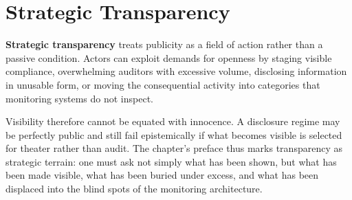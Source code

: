 
\chapter{Strategic Transparency}
\label{ch:ch061}


\textbf{Strategic transparency} treats publicity as a field of action rather than a passive condition. Actors can exploit demands for openness by staging visible compliance, overwhelming auditors with excessive volume, disclosing information in unusable form, or moving the consequential activity into categories that monitoring systems do not inspect.

Visibility therefore cannot be equated with innocence. A disclosure regime may be perfectly public and still fail epistemically if what becomes visible is selected for theater rather than audit. The chapter's preface thus marks transparency as strategic terrain: one must ask not simply what has been shown, but what has been made visible, what has been buried under excess, and what has been displaced into the blind spots of the monitoring architecture.
